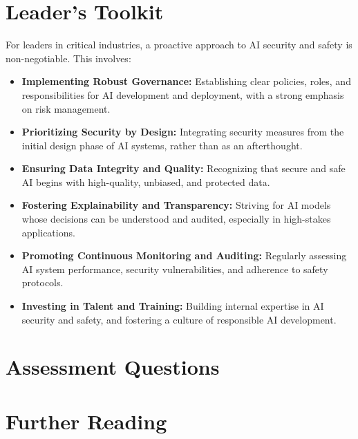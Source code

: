 \section{Leader's Toolkit}
\label{sec:security_leaders_toolkit}
For leaders in critical industries, a proactive approach to AI security and safety is non-negotiable. This involves:
\begin{itemize}
    \item \textbf{Implementing Robust Governance:} Establishing clear policies, roles, and responsibilities for AI development and deployment, with a strong emphasis on risk management.
    \item \textbf{Prioritizing Security by Design:} Integrating security measures from the initial design phase of AI systems, rather than as an afterthought.
    \item \textbf{Ensuring Data Integrity and Quality:} Recognizing that secure and safe AI begins with high-quality, unbiased, and protected data.
    \item \textbf{Fostering Explainability and Transparency:} Striving for AI models whose decisions can be understood and audited, especially in high-stakes applications.
    \item \textbf{Promoting Continuous Monitoring and Auditing:} Regularly assessing AI system performance, security vulnerabilities, and adherence to safety protocols.
    \item \textbf{Investing in Talent and Training:} Building internal expertise in AI security and safety, and fostering a culture of responsible AI development.
\end{itemize}

\section{Assessment Questions}
\label{sec:security_assessment_questions}

\section{Further Reading}
\label{sec:security_further_reading}
